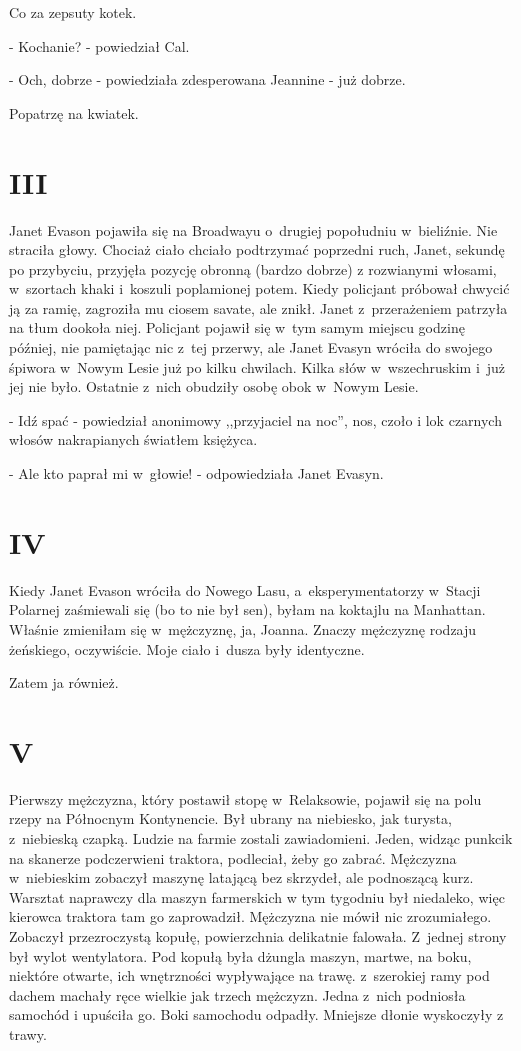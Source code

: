 \documentclass[oneside,polish,12pt,sfheadings]{mwbk}
\begin{document}
Co za zepsuty kotek.

- Kochanie? - powiedział Cal.

- Och, dobrze - powiedziała zdesperowana Jeannine - już dobrze.

Popatrzę na kwiatek.

\chapter{III}

Janet Evason pojawiła się na Broadwayu o~drugiej popołudniu w~bieliźnie.
Nie straciła głowy. Chociaż ciało chciało podtrzymać poprzedni ruch,
Janet, sekundę po przybyciu, przyjęła pozycję obronną (bardzo dobrze)
z rozwianymi włosami, w~szortach khaki i~koszuli poplamionej potem.
Kiedy policjant próbował chwycić ją za ramię, zagroziła mu ciosem
savate, ale znikł. Janet z~przerażeniem patrzyła na tłum dookoła niej.
Policjant pojawił się w~tym samym miejscu godzinę później, nie pamiętając
nic z~tej przerwy, ale Janet Evasyn wróciła do swojego śpiwora w~Nowym
Lesie już po kilku chwilach. Kilka słów w~wszechruskim i~już jej nie
było. Ostatnie z~nich obudziły osobę obok w~Nowym Lesie.

- Idź spać - powiedział anonimowy ,,przyjaciel na noc'', nos, czoło i
lok czarnych włosów nakrapianych światłem księżyca.

- Ale kto paprał mi w~głowie! - odpowiedziała Janet Evasyn.

\chapter{IV}

Kiedy Janet Evason wróciła do Nowego Lasu, a~eksperymentatorzy w~Stacji
Polarnej zaśmiewali się (bo to nie był sen), byłam na koktajlu na
Manhattan. Właśnie zmieniłam się w~mężczyznę, ja, Joanna. Znaczy mężczyznę
rodzaju żeńskiego, oczywiście. Moje ciało i~dusza były identyczne.

Zatem ja również.

\chapter{V}

Pierwszy mężczyzna, który postawił stopę w~Relaksowie, pojawił się
na polu rzepy na Północnym Kontynencie. Był ubrany na niebiesko, jak
turysta, z~niebieską czapką. Ludzie na farmie zostali zawiadomieni.
Jeden, widząc punkcik na skanerze podczerwieni traktora, podleciał,
żeby go zabrać. Mężczyzna w~niebieskim zobaczył maszynę latającą bez
skrzydeł, ale podnoszącą kurz. Warsztat naprawczy dla maszyn farmerskich
w tym tygodniu był niedaleko, więc kierowca traktora tam go zaprowadził.
Mężczyzna nie mówił nic zrozumiałego. Zobaczył przezroczystą kopułę,
powierzchnia delikatnie falowała. Z~jednej strony był wylot wentylatora.
Pod kopułą była dżungla maszyn, martwe, na boku, niektóre otwarte,
ich wnętrzności wypływające na trawę. z~szerokiej ramy pod dachem machały
ręce wielkie jak trzech mężczyzn. Jedna z~nich podniosła samochód
i upuściła go. Boki samochodu odpadły. Mniejsze dłonie wyskoczyły
z trawy.
\end{document}
